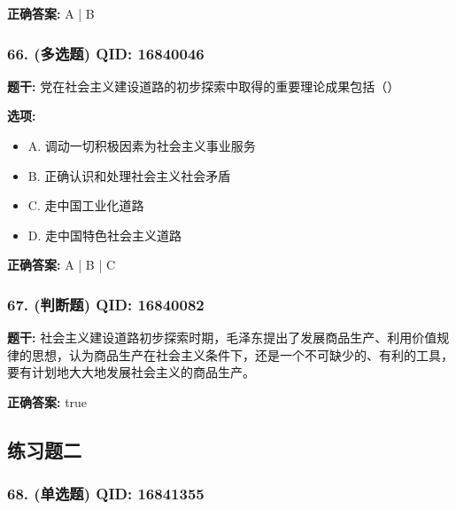 \documentclass[12pt,UTF8]{ctexart}
\begin{document}
\textbf{正确答案:}
A | B

\vspace{0.3em}\hrulefill\vspace{0.7em}

\subsubsection*{66. (多选题) \small QID: 16840046}

\textbf{题干:}
党在社会主义建设道路的初步探索中取得的重要理论成果包括（）

\textbf{选项:}
\begin{itemize}[leftmargin=*]

  \item A. 调动一切积极因素为社会主义事业服务

  \item B. 正确认识和处理社会主义社会矛盾

  \item C. 走中国工业化道路

  \item D. 走中国特色社会主义道路

\end{itemize}

\textbf{正确答案:}
A | B | C

\vspace{0.3em}\hrulefill\vspace{0.7em}

\subsubsection*{67. (判断题) \small QID: 16840082}

\textbf{题干:}
社会主义建设道路初步探索时期，毛泽东提出了发展商品生产、利用价值规律的思想，认为商品生产在社会主义条件下，还是一个不可缺少的、有利的工具，要有计划地大大地发展社会主义的商品生产。

\textbf{正确答案:}
true

\vspace{0.3em}\hrulefill\vspace{0.7em}

\subsection*{练习题二}

\subsubsection*{68. (单选题) \small QID: 16841355}
\end{document}
